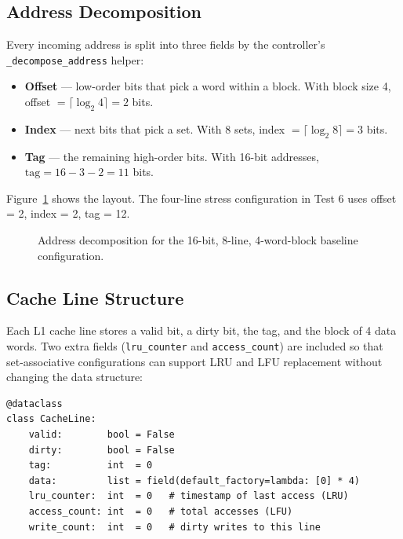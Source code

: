 \documentclass[11pt,a4paper]{article}
\begin{document}
\subsection{Address Decomposition}

Every incoming address is split into three fields by the controller's
\texttt{\_decompose\_address} helper:

\begin{itemize}[leftmargin=1.4em,itemsep=0.1em]
    \item \textbf{Offset} — low-order bits that pick a word within a block.
    With block size 4, offset $= \lceil \log_2 4 \rceil = 2$ bits.
    \item \textbf{Index} — next bits that pick a set. With 8 sets,
    index $= \lceil \log_2 8 \rceil = 3$ bits.
    \item \textbf{Tag} — the remaining high-order bits. With 16-bit addresses,
    $\text{tag} = 16 - 3 - 2 = 11$ bits.
\end{itemize}

Figure~\ref{fig:addr} shows the layout. The four-line stress configuration in
Test 6 uses offset = 2, index = 2, tag = 12.

\begin{figure}[h]
    \centering
    \caption{Address decomposition for the 16-bit, 8-line, 4-word-block
    baseline configuration.}
    \label{fig:addr}
\end{figure}

\subsection{Cache Line Structure}

Each L1 cache line stores a valid bit, a dirty bit, the tag, and the block of
4 data words. Two extra fields (\texttt{lru\_counter} and
\texttt{access\_count}) are included so that set-associative configurations
can support LRU and LFU replacement without changing the data structure:

\begin{lstlisting}
@dataclass
class CacheLine:
    valid:        bool = False
    dirty:        bool = False
    tag:          int  = 0
    data:         list = field(default_factory=lambda: [0] * 4)
    lru_counter:  int  = 0   # timestamp of last access (LRU)
    access_count: int  = 0   # total accesses (LFU)
    write_count:  int  = 0   # dirty writes to this line
\end{lstlisting}
\end{document}
